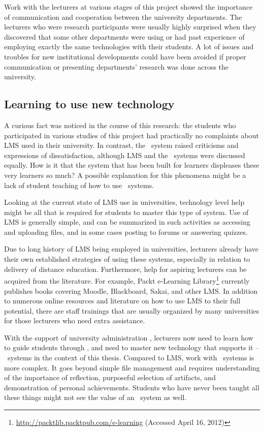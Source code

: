 Work with the lecturers at various stages of this project showed the importance
of communication and cooperation between the university departments. The
lecturers who were research participants were usually highly surprised when they
discovered that some other departments were using or had past experience of
employing exactly the same technologies with their students. A lot of issues and
troubles for new institutional developments could have been avoided if proper
communication or presenting departments' research was done across the university.

\subsection[Learning to Use New Technology]{Learning to use new technology}

A curious fact was noticed in the course of this research: the students who
participated in various studies of this project had practically no complaints
about LMS used in their university. In contrast, the \ep~system raised
criticisms and expressions of dissatisfaction, although LMS and the \ep~systems
were discussed equally. How is it that the system that has been built for
learners displeases these very learners so much? A possible explanation for this
phenomena might be a lack of student teaching of how to use \ep~systems.

Looking at the current state of LMS use in universities, technology level help
might be all that is required for students to master this type of system. Use of
LMS is generally simple, and can be summarized in such activities as accessing
and uploading files, and in some cases posting to forums or answering quizzes.

Due to long history of LMS being employed in universities, lecturers already
have their own established strategies of using these systems, especially in
relation to delivery of distance education. Furthermore, help for aspiring
lecturers can be acquired from the literature. For example, Packt e-Learning
Library\footnote{\url{http://packtlib.packtpub.com/e-learning} (Accessed April
16, 2012)} currently publishes books covering Moodle, Blackboard, Sakai, and
other LMS. In addition to numerous online resources and literature on how to use
LMS to their full potential, there are staff trainings that are usually
organized by many universities for those lecturers who need extra assistance.

With the support of university administration \citep{DiBenedetto2005}, 
lecturers now need to learn how to guide students through \LLLsn, and need to
master new technology that supports it \citep{Levin2008} -- \ep~systems in the
context of this thesis. Compared to LMS, work with \ep~systems is more complex.
It goes beyond simple file management and requires understanding of the
importance of reflection, purposeful selection of artifacts, and demonstration
of personal achievements. Students who have never been taught all these things
might not see the value of an \ep~system as well.

